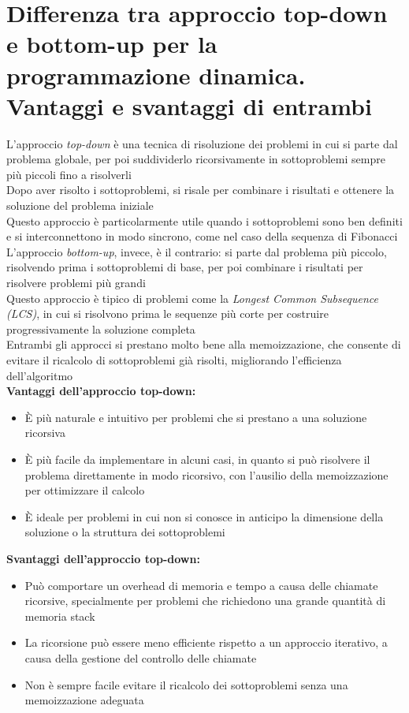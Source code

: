 \documentclass[12pt,oneside,a4paper]{article}
\begin{document}
\section{Differenza tra approccio top-down e bottom-up per la programmazione dinamica. Vantaggi e svantaggi di entrambi}
L'approccio \textit{top-down} è una tecnica di risoluzione dei problemi in cui si parte dal problema globale, per poi suddividerlo ricorsivamente in sottoproblemi sempre più piccoli fino a risolverli\\
Dopo aver risolto i sottoproblemi, si risale per combinare i risultati e ottenere la soluzione del problema iniziale\\
Questo approccio è particolarmente utile quando i sottoproblemi sono ben definiti e si interconnettono in modo sincrono, come nel caso della sequenza di Fibonacci\\
L'approccio \textit{bottom-up}, invece, è il contrario: si parte dal problema più piccolo, risolvendo prima i sottoproblemi di base, per poi combinare i risultati per risolvere problemi più grandi\\
Questo approccio è tipico di problemi come la \textit{Longest Common Subsequence (LCS)}, in cui si risolvono prima le sequenze più corte per costruire progressivamente la soluzione completa\\
Entrambi gli approcci si prestano molto bene alla memoizzazione, che consente di evitare il ricalcolo di sottoproblemi già risolti, migliorando l'efficienza dell'algoritmo\\
\textbf{Vantaggi dell'approccio top-down:}
\begin{itemize}
\item È più naturale e intuitivo per problemi che si prestano a una soluzione ricorsiva
\item È più facile da implementare in alcuni casi, in quanto si può risolvere il problema direttamente in modo ricorsivo, con l'ausilio della memoizzazione per ottimizzare il calcolo
\item È ideale per problemi in cui non si conosce in anticipo la dimensione della soluzione o la struttura dei sottoproblemi
\end{itemize}
\textbf{Svantaggi dell'approccio top-down:}
\begin{itemize}
\item Può comportare un overhead di memoria e tempo a causa delle chiamate ricorsive, specialmente per problemi che richiedono una grande quantità di memoria stack
\item La ricorsione può essere meno efficiente rispetto a un approccio iterativo, a causa della gestione del controllo delle chiamate
\item Non è sempre facile evitare il ricalcolo dei sottoproblemi senza una memoizzazione adeguata
\end{itemize}
\end{document}
